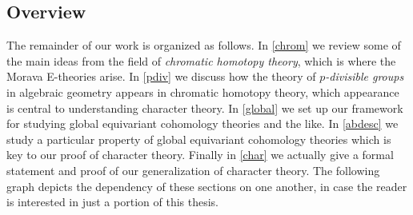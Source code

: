 
\subsection{Overview}
\label{intro-overview}

The remainder of our work is organized as follows. In \cref{chrom} we
review some of the main ideas from the field of \emph{chromatic
  homotopy theory}, which is where the Morava E-theories arise. In
\cref{pdiv} we discuss how the theory of \emph{$p$-divisible groups}
in algebraic geometry appears in chromatic homotopy theory, which
appearance is central to understanding character theory. In
\cref{global} we set up our framework for studying global equivariant
cohomology theories and the like. In \cref{abdesc} we study a
particular property of global equivariant cohomology theories which is
key to our proof of character theory. Finally in \cref{char} we
actually give a formal statement and proof of our generalization of
character theory. The following graph depicts the dependency of these
sections on one another, in case the reader is interested in just a
portion of this thesis.

\usetikzlibrary{positioning}
\begin{center}
\end{center}

